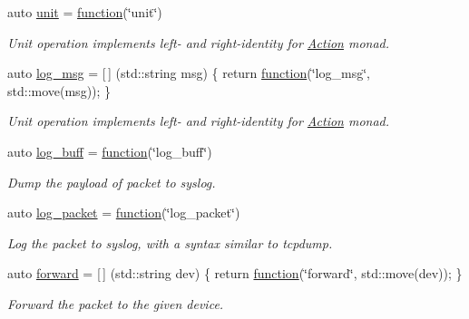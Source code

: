 \begin{DoxyCompactItemize}
auto \hyperlink{namespacepfq_1_1lang_1_1anonymous__namespace_02default_8hpp_03_a85f9b2d401cbb1d135679160de0e97de}{unit} = \hyperlink{namespacepfq_1_1lang_a1a4638059d700ae08d0ca63886ff2bb3}{function}(\char`\"{}unit\char`\"{})
\begin{DoxyCompactList}\small\item\em Unit operation implements left-\/ and right-\/identity for \hyperlink{structpfq_1_1lang_1_1Action}{Action} monad. \end{DoxyCompactList}\item 
auto \hyperlink{namespacepfq_1_1lang_1_1anonymous__namespace_02default_8hpp_03_a82e76226844f043aac9a2dd01615c9bb}{log\+\_\+msg} = \mbox{[}$\,$\mbox{]} (std\+::string msg) \{ return \hyperlink{namespacepfq_1_1lang_a1a4638059d700ae08d0ca63886ff2bb3}{function}(\char`\"{}log\+\_\+msg\char`\"{}, std\+::move(msg)); \}
\begin{DoxyCompactList}\small\item\em Unit operation implements left-\/ and right-\/identity for \hyperlink{structpfq_1_1lang_1_1Action}{Action} monad. \end{DoxyCompactList}\item 
auto \hyperlink{namespacepfq_1_1lang_1_1anonymous__namespace_02default_8hpp_03_ac16d4c4b496e6e882901d84ded462101}{log\+\_\+buff} = \hyperlink{namespacepfq_1_1lang_a1a4638059d700ae08d0ca63886ff2bb3}{function}(\char`\"{}log\+\_\+buff\char`\"{})
\begin{DoxyCompactList}\small\item\em Dump the payload of packet to syslog. \end{DoxyCompactList}\item 
auto \hyperlink{namespacepfq_1_1lang_1_1anonymous__namespace_02default_8hpp_03_aed6076a98aece625738cbda3689183e2}{log\+\_\+packet} = \hyperlink{namespacepfq_1_1lang_a1a4638059d700ae08d0ca63886ff2bb3}{function}(\char`\"{}log\+\_\+packet\char`\"{})
\begin{DoxyCompactList}\small\item\em Log the packet to syslog, with a syntax similar to tcpdump. \end{DoxyCompactList}\item 
auto \hyperlink{namespacepfq_1_1lang_1_1anonymous__namespace_02default_8hpp_03_aae08247030fea0f5e398b0a03d382257}{forward} = \mbox{[}$\,$\mbox{]} (std\+::string dev) \{ return \hyperlink{namespacepfq_1_1lang_a1a4638059d700ae08d0ca63886ff2bb3}{function}(\char`\"{}forward\char`\"{}, std\+::move(dev)); \}
\begin{DoxyCompactList}\small\item\em Forward the packet to the given device. \end{DoxyCompactList}\item 

\end{DoxyCompactItemize}
